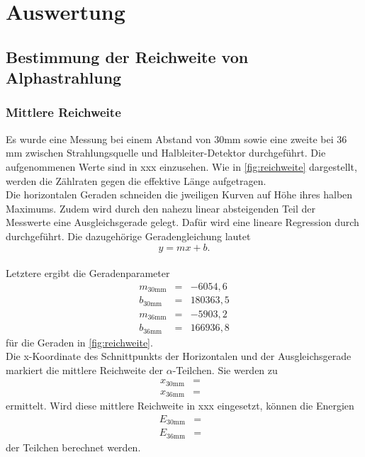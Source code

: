 \section{Auswertung}
\label{sec:Auswertung}

\subsection{Bestimmung der Reichweite von Alphastrahlung}
\subsubsection*{Mittlere Reichweite}
Es wurde eine Messung bei einem Abstand von $30$mm sowie eine zweite bei $36$mm zwischen 
Strahlungsquelle und Halbleiter-Detektor durchgeführt. 
Die aufgenommenen Werte sind in xxx einzusehen.
Wie in \autoref{fig:reichweite} dargestellt, werden die Zählraten gegen die effektive Länge 
aufgetragen.\\
Die horizontalen Geraden schneiden die jweiligen Kurven auf Höhe ihres halben
Maximums. Zudem wird durch den nahezu linear absteigenden Teil der Messwerte eine 
Ausgleichsgerade gelegt. Dafür wird eine lineare Regression durch \cite{numpy} durchgeführt. Die 
dazugehörige Geradengleichung lautet
\begin{equation}
  y = mx + b.
  \label{eq:linreg}
\end{equation}\\
Letztere ergibt die Geradenparameter
\begin{eqnarray}
  m_{\mathrm{30mm}} &=&  -6054,6  \nonumber  \\
  b_{\mathrm{30mm}} &=&  180363,5 \nonumber  \\
  m_{\mathrm{36mm}} &=&  -5903,2  \nonumber  \\
  b_{\mathrm{36mm}} &=&  166936,8 \nonumber
\end{eqnarray}
für die Geraden in \autoref{fig:reichweite}.\\
Die x-Koordinate des Schnittpunkts der Horizontalen und der Ausgleichsgerade markiert die 
mittlere Reichweite der $\alpha$-Teilchen. 
Sie werden zu 
\begin{eqnarray}
  x_{\mathrm{30mm}} &=&   \nonumber  \\
  x_{\mathrm{36mm}} &=&    \nonumber  
\end{eqnarray}
ermittelt.
Wird diese mittlere Reichweite in xxx eingesetzt, können die Energien 
\begin{eqnarray}
  E_{\mathrm{30mm}} &=&   \nonumber  \\
  E_{\mathrm{36mm}} &=&    \nonumber  
\end{eqnarray}
der Teilchen berechnet werden. 



